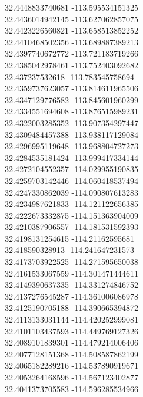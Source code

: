 {32.4448833740681	-113.595534151325\\
32.4436014942145	-113.627062857075\\
32.4423226560821	-113.658513852252\\
32.4410468502356	-113.689887389213\\
32.4397740672772	-113.721183719266\\
32.4385042978461	-113.752403092682\\
32.437237532618	-113.783545758694\\
32.4359737623057	-113.814611965506\\
32.4347129776582	-113.845601960299\\
32.4334551694608	-113.876515989231\\
32.4322003285352	-113.907354297447\\
32.4309484457388	-113.938117129084\\
32.4296995119648	-113.968804727273\\
32.4284535181424	-113.999417334144\\
32.4272104552357	-114.029955190835\\
32.4259703142446	-114.060418537494\\
32.4247330862039	-114.090807613283\\
32.4234987621833	-114.121122656385\\
32.4222673332875	-114.151363904009\\
32.4210387906557	-114.181531592393\\
32.4198131254615	-114.21162595681\\
32.418590328913	-114.241647231573\\
32.4173703922525	-114.271595650038\\
32.4161533067559	-114.301471444611\\
32.4149390637335	-114.331274846752\\
32.4137276545287	-114.361006086978\\
32.4125190705188	-114.390665394872\\
32.4113133031144	-114.420252999081\\
32.4101103437593	-114.449769127326\\
32.4089101839301	-114.479214006406\\
32.4077128151368	-114.508587862199\\
32.4065182289216	-114.537890919671\\
32.4053264168596	-114.567123402877\\
32.4041373705583	-114.596285534966\\
}
